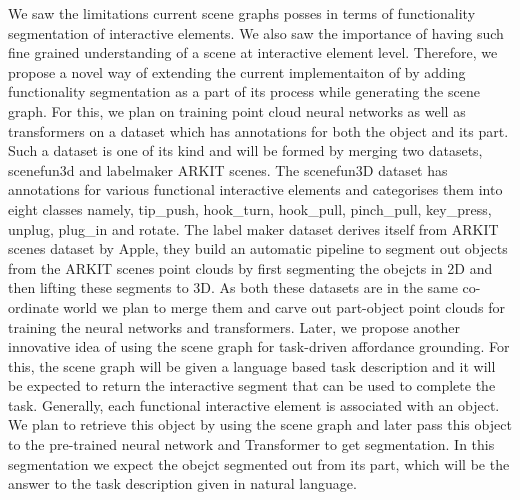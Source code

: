 We saw the limitations current scene graphs posses in terms of functionality segmentation of interactive elements. We also
saw the importance of having such fine grained understanding of a scene at interactive element level. Therefore, we propose a novel way of
extending the current implementaiton of \cite{ConceptGraphs} by adding functionality segmentation as a part of its process while generating the 
scene graph. For this, we plan on training point cloud neural networks as well as transformers on a dataset which has annotations for both the
object and its part. Such a dataset is one of its kind and will be formed by merging two datasets, scenefun3d and labelmaker ARKIT scenes.
The scenefun3D dataset has annotations for various functional interactive elements and categorises them into eight classes namely,
tip_push, hook_turn, hook_pull, pinch_pull, key_press, unplug, plug_in and rotate. The label maker dataset derives itself from ARKIT scenes dataset
by Apple, they build an automatic pipeline to segment out objects from the ARKIT scenes point clouds by first segmenting the obejcts in 2D and 
then lifting these segments to 3D. As both these datasets are in the same co-ordinate world we plan to merge them and carve out part-object
point clouds for training the neural networks and transformers. Later, we propose another innovative idea of using the scene graph for 
task-driven affordance grounding. For this, the scene graph will be given a language based task description and it will be expected to return
the interactive segment that can be used to complete the task. Generally, each functional interactive element is associated with an object.
We plan to retrieve this object by using the scene graph and later pass this object to the pre-trained neural network and Transformer to get
segmentation. In this segmentation we expect the obejct segmented out from its part, which will be the answer to the task description given in 
natural language.